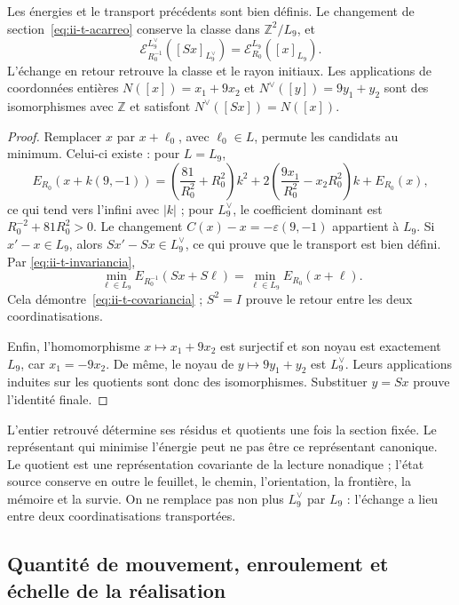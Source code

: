 \begin{theorem}
\label{thm:ii-t-cociente}
Les énergies et le transport précédents sont bien définis. Le changement
de section~\eqref{eq:ii-t-acarreo} conserve la classe dans
\(\mathbb Z^2/L_9\), et
\begin{equation}
 \mathcal E_{R_0^{-1}}^{L_9^\vee}([Sx]_{L_9^\vee})
 =\mathcal E_{R_0}^{L_9}([x]_{L_9}).
 \label{eq:ii-t-covariancia}
\end{equation}
L’échange en retour retrouve la classe et le rayon initiaux. Les
applications de coordonnées entières \(N([x])=x_1+9x_2\) et
\(N^\vee([y])=9y_1+y_2\) sont des isomorphismes avec \(\mathbb Z\)
et satisfont \(N^\vee([Sx])=N([x])\).
\end{theorem}

\begin{proof}
Remplacer \(x\) par \(x+\ell_0\), avec \(\ell_0\in L\),
permute les candidats au minimum. Celui-ci existe : pour \(L=L_9\),
\[
 E_{R_0}(x+k(9,-1))
 =\left(\frac{81}{R_0^2}+R_0^2\right)k^2
  +2\left(\frac{9x_1}{R_0^2}-x_2R_0^2\right)k+E_{R_0}(x),
\]
ce qui tend vers l’infini avec \(|k|\) ; pour \(L_9^\vee\), le
coefficient dominant est \(R_0^{-2}+81R_0^2>0\). Le changement
\(C(x)-x=-\varepsilon(9,-1)\) appartient à \(L_9\).
Si \(x'-x\in L_9\), alors \(Sx'-Sx\in L_9^\vee\),
ce qui prouve que le transport est bien défini. Par
\eqref{eq:ii-t-invariancia},
\[
 \min_{\ell\in L_9}E_{R_0^{-1}}(Sx+S\ell)
 =\min_{\ell\in L_9}E_{R_0}(x+\ell).
\]
Cela démontre~\eqref{eq:ii-t-covariancia} ; \(S^2=I\) prouve
le retour entre les deux coordinatisations.

Enfin, l’homomorphisme \(x\mapsto x_1+9x_2\) est
surjectif et son noyau est exactement \(L_9\), car
\(x_1=-9x_2\). De même, le noyau de
\(y\mapsto9y_1+y_2\) est \(L_9^\vee\). Leurs applications
induites sur les quotients sont donc des isomorphismes. Substituer
\(y=Sx\) prouve l’identité finale.
\end{proof}

L’entier retrouvé détermine ses résidus et quotients une fois la
section fixée. Le représentant qui minimise l’énergie peut ne pas être ce
représentant canonique. Le quotient est une représentation covariante de la
lecture nonadique ; l’état source conserve en outre le feuillet, le chemin, l’orientation,
la frontière, la mémoire et la survie. On ne remplace pas non plus \(L_9^\vee\)
par \(L_9\) : l’échange a lieu entre deux coordinatisations transportées.

\subsection{Quantité de mouvement, enroulement et échelle de la réalisation}


